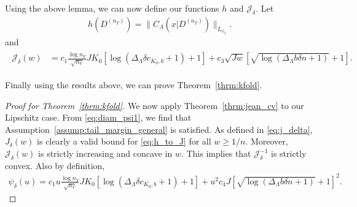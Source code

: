 \documentclass[10pt]{book}
\theoremstyle{definition}
\begin{document}
Using the above lemma, we can now define our functions $h$ and $\mathcal{J}_\delta$.
Let
\begin{align}
h(D^{(n_T)}) = \|C_\Lambda(x|D^{(n_T)})\|_{L_{\psi_2}}.
\end{align}
and
\begin{align}
\begin{split}
\label{eq:j_delta}
\mathcal{J}_{\delta}(w) & =
c_{1} \frac{\log n_{V}}{\sqrt{n_{V}}}
JK_0\left[\log\left(\Delta_{\Lambda}\delta c_{K_0, b}+1\right)+1\right]
+c_{3}\sqrt{Jw}
\left[\sqrt{\log\left(\Delta_{\Lambda}b \delta n +1\right)}+1\right].
\end{split}
\end{align}

Finally using the results above, we can prove Theorem~\ref{thrm:kfold}.
\begin{proof}[Proof for Theorem~\ref{thrm:kfold}]
	We now apply Theorem~\ref{thrm:jean_cv} to our Lipschitz case.
	From \eqref{eq:diam_psi1}, we find that Assumption~\ref{assump:tail_margin_general} is satisfied.
	As defined in \eqref{eq:j_delta}, $J_\delta(w)$ is clearly a valid bound for \eqref{eq:h_to_J} for all $w \ge 1/n$.
	Moreover, $\mathcal{J}_{\delta}(w)$ is strictly increasing and concave in $w$.
	This implies that $\mathcal{J}_{\delta}^{-1}$ is strictly convex.
	Also by definition,
	\begin{align}
	\psi_{\delta}(u)
	= c_{1} u \frac{\log n_{V}}{\sqrt{n_{V}}}
	JK_0\left[\log\left(\Delta_{\Lambda}\delta c_{K_0, b}+1\right)+1\right]
	+ u^2 c_{4} J
	\left[\sqrt{\log\left(\Delta_{\Lambda}b \delta n +1\right)}+1\right]^2.
	\end{align}

\end{proof}
\end{document}
